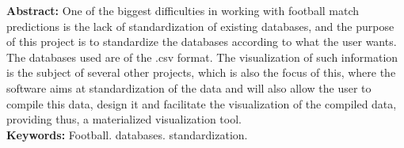 \begin{singlespace}
\textbf{Abstract: }
One of the biggest difficulties in working with football match predictions is the lack of standardization of existing databases, and the purpose of this project is to standardize the databases according to what the user wants. The databases used are of the .csv format. The visualization of such information is the subject of several other projects, which is also the focus of this, where the software aims at standardization of the data and will also allow the user to compile this data, design it and facilitate the visualization of the compiled data, providing thus, a materialized visualization tool.\\
\textbf{Keywords: }
Football. databases. standardization.
\end{singlespace}
